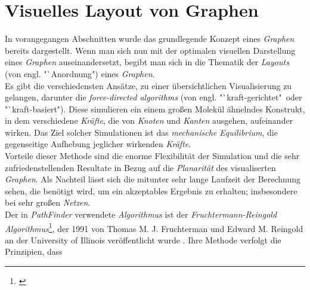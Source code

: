 \documentclass[12pt]{article}
\begin{document}
\section{Visuelles Layout von Graphen}
\label{sec:layout}
In vorangegangen Abschnitten wurde das grundlegende Konzept eines \textit{Graphen} bereits dargestellt. Wenn man sich nun mit der optimalen visuellen Darstellung eines \textit{Graphen} auseinandersetzt, begibt man sich in die Thematik der \textit{Layouts} (von engl. "`Anordnung") eines \textit{Graphen}.
\\ 
Es gibt die verschiedensten Ansätze, zu einer übersichtlichen Visualisierung zu gelangen, darunter die \textit{force-directed algorithms} (von engl. "`kraft-gerichtet"\ oder "`kraft-basiert")\cite{force-directed}. Diese simulieren ein einem großen Molekül ähnelndes Konstrukt, in dem verschiedene \textit{Kräfte}, die von \textit{Knoten} und \textit{Kanten} ausgehen, aufeinander wirken. Das Ziel solcher Simulationen ist das \textit{mechanische Equilibrium}, die gegenseitige Aufhebung jeglicher wirkenden \textit{Kräfte}.
\\
Vorteile dieser Methode sind die enorme Flexibilität der Simulation und die sehr zufriedenstellenden Resultate in Bezug auf die \textit{Planarität} des visualiserten \textit{Graphen}. Als Nachteil lässt sich die mitunter sehr lange Laufzeit der Berechnung sehen, die benötigt wird, um ein akzeptables Ergebnis zu erhalten; insbesondere bei sehr großen \textit{Netzen}.
\\
Der in \textit{PathFinder} verwendete \textit{Algorithmus} ist der \textit{Fruchtermann-Reingold Algorithmus}\footnote{\cite[Kapitel 12.3, S. 386f]{force-directed2}}, der 1991 von Thomas M. J. Fruchterman und Edward M. Reingold an der University of Illinois veröffentlicht wurde \cite{fruchterman}. Ihre Methode verfolgt die Prinzipien, dass
\end{document}

